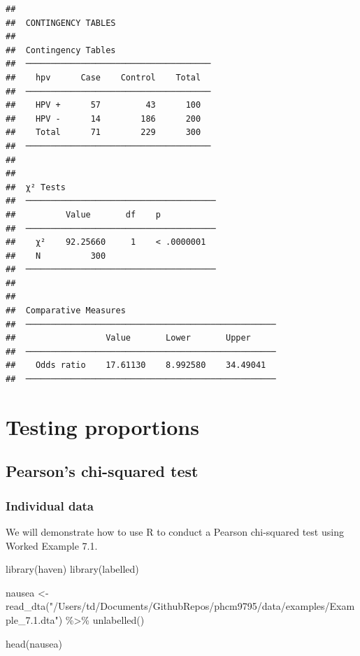 \documentclass[
]{memoir}
\newenvironment{Shaded}{\begin{snugshade}}{\end{snugshade}}
\newcommand{\FunctionTok}[1]{\textcolor[rgb]{0.00,0.00,0.00}{#1}}
\newcommand{\NormalTok}[1]{#1}
\newcommand{\OtherTok}[1]{\textcolor[rgb]{0.56,0.35,0.01}{#1}}
\newcommand{\SpecialCharTok}[1]{\textcolor[rgb]{0.00,0.00,0.00}{#1}}
\newcommand{\StringTok}[1]{\textcolor[rgb]{0.31,0.60,0.02}{#1}}
\begin{document}
\begin{verbatim}
## 
##  CONTINGENCY TABLES
## 
##  Contingency Tables                    
##  ───────────────────────────────────── 
##    hpv      Case    Control    Total   
##  ───────────────────────────────────── 
##    HPV +      57         43      100   
##    HPV -      14        186      200   
##    Total      71        229      300   
##  ───────────────────────────────────── 
## 
## 
##  χ² Tests                               
##  ────────────────────────────────────── 
##          Value       df    p            
##  ────────────────────────────────────── 
##    χ²    92.25660     1    < .0000001   
##    N          300                       
##  ────────────────────────────────────── 
## 
## 
##  Comparative Measures                               
##  ────────────────────────────────────────────────── 
##                  Value       Lower       Upper      
##  ────────────────────────────────────────────────── 
##    Odds ratio    17.61130    8.992580    34.49041   
##  ──────────────────────────────────────────────────
\end{verbatim}

\hypertarget{testing-proportions}{%
\chapter{Testing proportions}\label{testing-proportions}}

\hypertarget{pearsons-chi-squared-test}{%
\section{Pearson's chi-squared test}\label{pearsons-chi-squared-test}}

\hypertarget{individual-data-1}{%
\subsection{Individual data}\label{individual-data-1}}

We will demonstrate how to use R to conduct a Pearson chi-squared test using Worked Example 7.1.

\begin{Shaded}
\begin{Highlighting}[]
\FunctionTok{library}\NormalTok{(haven)}
\FunctionTok{library}\NormalTok{(labelled)}

\NormalTok{nausea }\OtherTok{\textless{}{-}} \FunctionTok{read\_dta}\NormalTok{(}\StringTok{"/Users/td/Documents/GithubRepos/phcm9795/data/examples/Example\_7.1.dta"}\NormalTok{) }\SpecialCharTok{\%\textgreater{}\%} 
  \FunctionTok{unlabelled}\NormalTok{()}

\FunctionTok{head}\NormalTok{(nausea)}
\end{Highlighting}
\end{Shaded}
\end{document}
